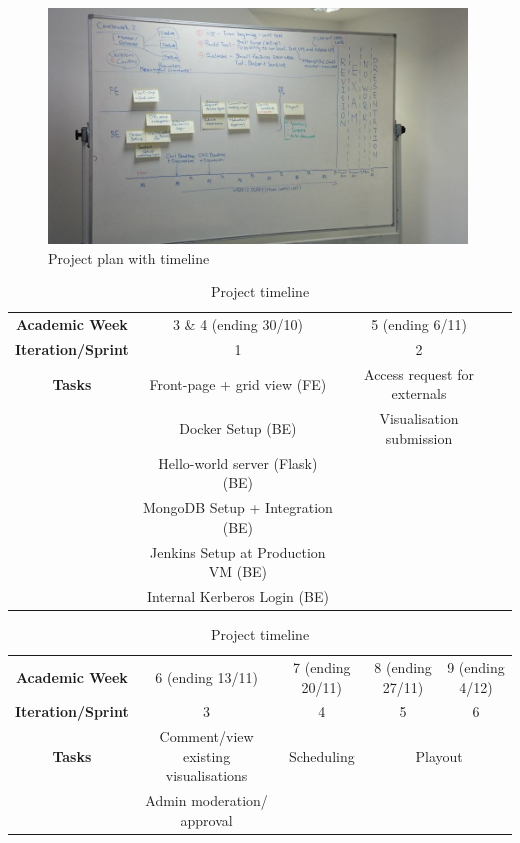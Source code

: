 \documentclass[a4paper]{article}
\begin{document}
\begin{figure}[h]
  \centering
    \includegraphics[width = 0.99\textwidth]{./planning/timeline.jpg}
   
  \caption{Project plan with timeline}
  \label{fig:timeline}
\end{figure}


\begin{table}[h]
  \begin{tabular}{c | c | c | c }
    \textbf{Academic Week} & 3 \& 4 (ending 30/10) & 5 (ending 6/11) \\
    \textbf{Iteration/Sprint} & 1 & 2 \\ \hline
    \textbf{Tasks} & Front-page + grid view (FE) & Access request for externals \\
          & Docker Setup (BE)           & Visualisation submission \\
          & Hello-world server (Flask) (BE) & \\
          & MongoDB Setup + Integration (BE) & \\
          & Jenkins Setup at Production VM (BE) & \\
          & Internal Kerberos Login (BE) & \\
  \end{tabular}

  \vspace{30pt}
  \begin{tabular}{c | c | c | c | c}
    \textbf{Academic Week} & 6 (ending 13/11) & 7 (ending 20/11) & 8 (ending 27/11) & 9 (ending 4/12) \\
    \textbf{Iteration/Sprint} & 3 & 4 & 5 & 6 \\ \hline
    \textbf{Tasks} & Comment/view existing visualisations & Scheduling & 
            \multicolumn{2}{c}{Playout} \\
          & Admin moderation/ approval &  \\
  \end{tabular}
  \caption{Project timeline}
  \label{table:timeline}
\end{table}
\end{document}
